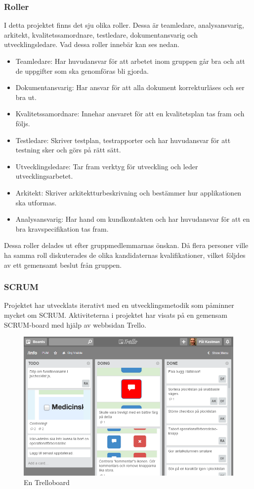 \documentclass{article}
\begin{document}
\subsubsection{Roller}
I detta projektet finns det sju olika roller. Dessa är teamledare, analysansvarig, arkitekt, kvalitetssamordnare, testledare, dokumentansvarig och utvecklingsledare. Vad dessa roller innebär kan ses nedan. 
\begin{itemize}
\item Teamledare: Har huvudansvar för att arbetet inom gruppen går bra och att de uppgifter som ska genomföras bli gjorda. 
\item Dokumentansvarig: Har ansvar för att alla dokument korrekturläses och ser bra ut. 
\item Kvalitetssamordnare: Innehar ansvaret för att en kvalitetsplan tas fram och följs. 
\item Testledare: Skriver testplan, testrapporter och har huvudansvar för att testning sker och görs på rätt sätt.
\item Utvecklingsledare: Tar fram verktyg för utveckling och leder utvecklingsarbetet.
\item Arkitekt: Skriver arkitektturbeskrivning och bestämmer hur applikationen ska utformas.
\item Analysansvarig: Har hand om kundkontakten och har huvudansvar för att en bra kravspecifikation tas fram.
\end{itemize}
Dessa roller delades ut efter gruppmedlemmarnas önskan. Då flera personer ville ha samma roll diskuterades de olika kandidaternas kvalifikationer, vilket följdes av ett gemensamt beslut från gruppen.

\subsubsection{SCRUM}
Projektet har utvecklats iterativt med en utvecklingsmetodik som påminner mycket om SCRUM. Aktiviteterna i projektet har visats på en gemensam SCRUM-board med hjälp av webbsidan Trello. 

\begin{figure}[H]
	\begin{center}
	\includegraphics[scale=0.5]{trello2.png}
	\caption{En Trelloboard}
	\label{fig:trello2}
	\end{center}
\end{figure}
\end{document}
